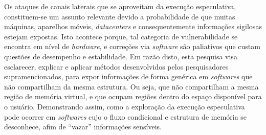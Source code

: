 \documentclass[
	article,			    %
	12pt,				    %
	oneside,			    %
	a4paper,			    %
	chapter=TITLE,		    %
	section=TITLE,		    %
	subsection=TITLE,	    %
	english,			    %
	brazil,				    %
	sumario=tradicional
]{abntex2}
\begin{document}
\begin{comment}
As outras fabricantes (\emph{AMD} e \emph{ARM Holdings}), em parceria com algumas montadoras e produtoras de \emph{softwares} também se pronunciaram em notas oficiais, assumindo ou não as falhas em seus produtos e, tomando certa medida de prevenção, formaram parcerias para lançarem correções em aplicações para usuário final (\emph{browsers} por exemplo), que previnem a exploração das falhas. Fabricantes de jogos que utilizam os processadores \emph{AMD} ou \emph{ARM}, como \emph{Sony} e \emph{Nintendo}, não se pronunciaram, conforme lista oficial publicada pela Universidade de Tecnologia de Graz \cite{meltdownspectreattack}.

Em 03 de Janeiro de 2018, pesquisadores da Universidade Católica de Leuven e do IT de Israel, das Universidades de Michigan e Adelaide e da \emph{CSIRO Data61}, fizeram novas publicações comprovativas de duas novas derivações da \emph{Spectre}. Batizadas de \emph{Foreshadow}\footnote{Prefigurar, pressupor ou prévio (``fore'', inglês). Assim como no \footnotemark[\numexpr\value{footnote}-2], o nome deriva da causa da falha.} e \emph{Foreshadow-NG}, em processadores de servidores e em máquinas virtuais \cite{vanbulck2018foreshadow}.

Em 01 de Março de 2019, pesquisadores do Instituto Politécnico de Worcester e da Universidade de Lübeck, publicaram um artigo expondo mais uma possibilidade de exploração do comportamento arquitetural dos processadores da \emph{Intel}. Chamada de \emph{Spoiler}, esta nova vulnerabilidade não é uma variação das anteriores e nenhum dos métodos de mitigação divulgados até a data desta pesquisa, suprimem esta nova forma de realizar vazamentos de informações \cite{islam2019spoiler}.

Tal assunto adquiriu grande importância na divulgação pelos veículos de comunicação, pois é provável que muitas máquinas, aparelhos móveis, \emph{datacenters} e consequentemente informações sigilosas sejam expostas e continuem sendo. Isto se dá, porque tal categoria de vulnerabilidade está em nível de \emph{hardware}, e correções via \emph{software} são paliativos que custam questões de desempenho.
\end{comment}
Os ataques de canais laterais que se aproveitam da execução especulativa, constituem-se um assunto relevante devido a probabilidade de que muitas máquinas, aparelhos móveis, \emph{datacenters} e consequentemente informações sigilosas estejam expostas. Isto acontece porque, tal categoria de vulnerabilidade se encontra em nível de \emph{hardware}, e correções via \emph{software} são paliativos que custam questões de desempenho e estabilidade. Em razão disto, esta pesquisa visa esclarecer, explicar e aplicar métodos desenvolvidos pelos pesquisadores supramencionados, para expor informações de forma genérica em \emph{softwares} que não compartilham da mesma estrutura. Ou seja, que não compartilham a mesma região de memória virtual, e que ocupam regiões dentro do espaço disponível para o usuário. Demonstrando assim, como a exploração da execução especulativa pode ocorrer em \emph{softwares} cujo o fluxo condicional e estrutura de memória se desconhece, afim de ``vazar'' informações sensíveis.
\end{document}
